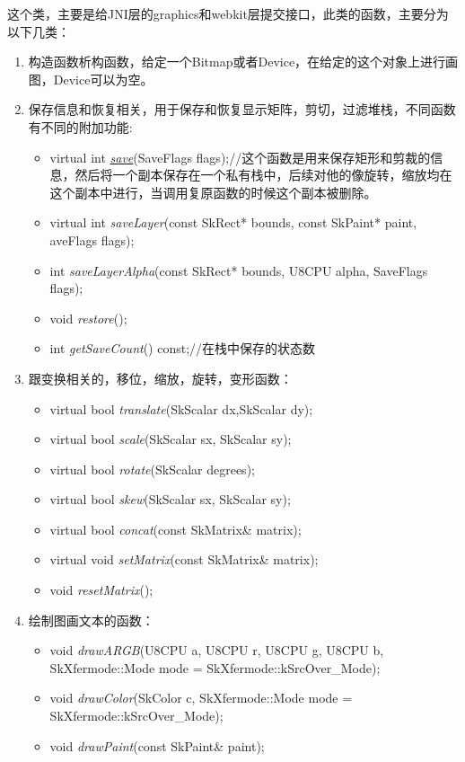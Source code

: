 这个类，主要是给JNI层的graphics和webkit层提交接口，此类的函数，主要分为以下几类：
\begin{enumerate}
\item 构造函数析构函数，给定一个Bitmap或者Device，在给定的这个对象上进行画图，Device可以为空。
\item 保存信息和恢复相关，用于保存和恢复显示矩阵，剪切，过滤堆栈，不同函数有不同的附加功能:
  \begin{itemize}
  \item virtual int \underline{\textit{save}}(SaveFlags flags);//这个函数是用来保存矩形和剪裁的信息，然后将一个副本保存在一个私有栈中，后续对他的像旋转，缩放均在这个副本中进行，当调用复原函数的时候这个副本被删除。
  \item virtual int \textit{saveLayer}(const SkRect* bounds, const SkPaint* paint, aveFlags flags);
  \item int \textit{saveLayerAlpha}(const SkRect* bounds, U8CPU alpha, SaveFlags flags);
  \item void \textit{restore}();
  \item int \textit{getSaveCount}() const;//在栈中保存的状态数
  \end{itemize}
\item 跟变换相关的，移位，缩放，旋转，变形函数：
  \begin{itemize}
  \item virtual bool \textit{translate}(SkScalar dx,SkScalar dy);
  \item virtual bool \textit{scale}(SkScalar sx, SkScalar sy);
  \item virtual bool \textit{rotate}(SkScalar degrees);
  \item virtual bool \textit{skew}(SkScalar sx, SkScalar sy);
  \item virtual bool \textit{concat}(const SkMatrix\& matrix);
  \item virtual void \textit{setMatrix}(const SkMatrix\& matrix);
  \item void \textit{resetMatrix}();
  \end{itemize}
\item 绘制图画文本的函数：
  \begin{itemize}
  \item void \textit{drawARGB}(U8CPU a, U8CPU r, U8CPU g, U8CPU b, SkXfermode::Mode mode = SkXfermode::kSrcOver\_Mode);
  \item void \textit{drawColor}(SkColor c, SkXfermode::Mode mode = SkXfermode::kSrcOver\_Mode);
  \item void \textit{drawPaint}(const SkPaint\& paint);

\end{itemize}
\end{enumerate}
